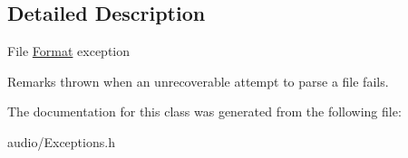 \subsection{Detailed Description}
File \hyperlink{structAudio_1_1Format}{Format} exception \begin{DoxyRemark}{Remarks}
thrown when an unrecoverable attempt to parse a file fails. 
\end{DoxyRemark}


The documentation for this class was generated from the following file\+:\begin{DoxyCompactItemize}
\item 
audio/Exceptions.\+h\end{DoxyCompactItemize}
